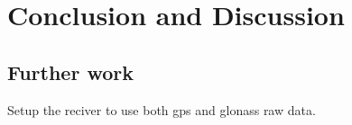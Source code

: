 
\chapter{Conclusion and Discussion}
\section{Further work}
Setup the reciver to use both gps and glonass raw data.
\cleardoublepage